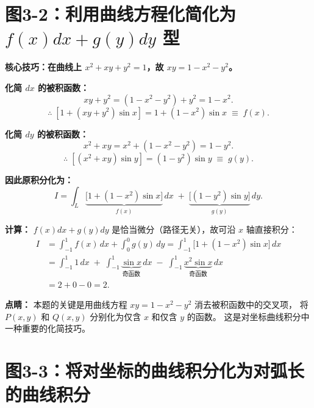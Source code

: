 \documentclass[12pt,a4paper]{ctexart}
\newcommand{\answerbox}[1]{%
  \begin{center}
  \fbox{\color{red}\large\bfseries #1}
  \end{center}
}
\begin{document}
\section{图3-2：利用曲线方程化简化为 $f(x)dx+g(y)dy$ 型}


\bigskip

\noindent\textbf{核心技巧：在曲线上 $x^2+xy+y^2=1$，故 $xy = 1 - x^2 - y^2$。}

\medskip
\noindent\textbf{化简 $dx$ 的被积函数：}
\[
xy + y^2 = (1 - x^2 - y^2) + y^2 = 1 - x^2.
\]
\[
\therefore\; [1 + (xy+y^2)\sin x] = 1 + (1-x^2)\sin x \;\equiv\; f(x).
\]

\noindent\textbf{化简 $dy$ 的被积函数：}
\[
x^2 + xy = x^2 + (1 - x^2 - y^2) = 1 - y^2.
\]
\[
\therefore\; [(x^2+xy)\sin y] = (1-y^2)\sin y \;\equiv\; g(y).
\]

\noindent\textbf{因此原积分化为：}
\[
I = \int_L \underbrace{\bigl[1 + (1-x^2)\sin x\bigr]}_{f(x)}\,dx
      \;+\; \underbrace{\bigl[(1-y^2)\sin y\bigr]}_{g(y)}\,dy.
\]

\noindent\textbf{计算：} $f(x)dx+g(y)dy$ 是恰当微分（路径无关），故可沿 $x$ 轴直接积分：
\[
\begin{aligned}
I &= \int_{-1}^1 f(x)\,dx + \int_0^0 g(y)\,dy
   = \int_{-1}^1 \bigl[1 + (1-x^2)\sin x\bigr]\,dx \\[4pt]
  &= \int_{-1}^1 1\,dx \;+\; \int_{-1}^1 \underbrace{\sin x}_{\text{奇函数}}\,dx
     \;-\; \int_{-1}^1 \underbrace{x^2\sin x}_{\text{奇函数}}\,dx \\[4pt]
  &= 2 + 0 - 0 = 2.
\end{aligned}
\]

\answerbox{$I = 2$}

\medskip
\color{blue!70!black}
\textbf{点睛：} 本题的关键是用曲线方程 $xy=1-x^2-y^2$ 消去被积函数中的交叉项，
将 $P(x,y)$ 和 $Q(x,y)$ 分别化为仅含 $x$ 和仅含 $y$ 的函数。
这是对坐标曲线积分中一种重要的化简技巧。
\color{black}

\newpage
\section{图3-3：将对坐标的曲线积分化为对弧长的曲线积分}
\end{document}
